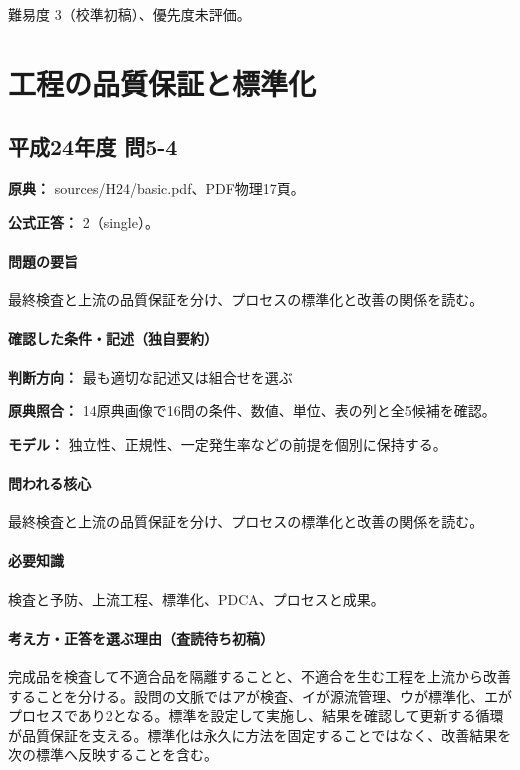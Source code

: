 \par 難易度 3（校準初稿）、優先度未評価。

\section{工程の品質保証と標準化}

\subsection{平成24年度 問5-4}
\label{q:h24-reg-basic-5-4}

\noindent\textbf{原典：} sources/H24/basic.pdf、PDF物理17頁。

\textbf{公式正答：} 2（single）。

\paragraph{問題の要旨} 最終検査と上流の品質保証を分け、プロセスの標準化と改善の関係を読む。

\paragraph{確認した条件・記述（独自要約）}\mbox{}\par

\noindent\textbf{判断方向：} 最も適切な記述又は組合せを選ぶ\par

\noindent\textbf{原典照合：} 14原典画像で16問の条件、数値、単位、表の列と全5候補を確認。\par

\noindent\textbf{モデル：} 独立性、正規性、一定発生率などの前提を個別に保持する。\par

\paragraph{問われる核心} 最終検査と上流の品質保証を分け、プロセスの標準化と改善の関係を読む。

\paragraph{必要知識} 検査と予防、上流工程、標準化、PDCA、プロセスと成果。

\paragraph{考え方・正答を選ぶ理由（査読待ち初稿）} 完成品を検査して不適合品を隔離することと、不適合を生む工程を上流から改善することを分ける。設問の文脈ではアが検査、イが源流管理、ウが標準化、エがプロセスであり2となる。標準を設定して実施し、結果を確認して更新する循環が品質保証を支える。標準化は永久に方法を固定することではなく、改善結果を次の標準へ反映することを含む。

